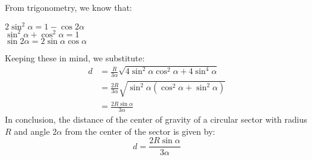 \documentclass[12pt]{article}
\begin{document}
From trigonometry, we know that:
\begin{center} 
$2\sin^2\alpha=1-\cos2\alpha$ \\
$\sin^2\alpha + \cos^2\alpha=1$\\
$\sin2\alpha=2\sin\alpha\cos\alpha$
\end{center}
Keeping these in mind, we substitute:
\begin{align*}
d&=\frac{R}{3\alpha}\sqrt{4\sin^2\alpha\cos^2\alpha + 4\sin^4\alpha}\\
 &=\frac{2R}{3\alpha}\sqrt{\sin^2\alpha(\cos^2\alpha + \sin^2\alpha)}\\
 &=\frac{2R\sin\alpha}{3\alpha}
\end{align*}
In conclusion, the distance of the center of gravity of a circular sector with radius $R$ and angle $2\alpha$ from the center of the sector is given by:
$$d=\frac{2R\sin\alpha}{3\alpha}$$

\end{document}
